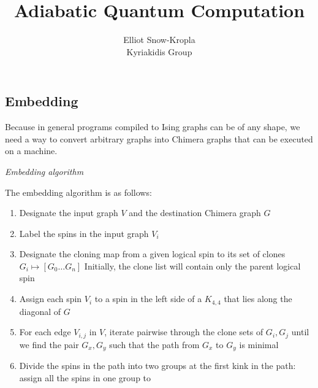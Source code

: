 \documentclass{article}
\title{Adiabatic Quantum Computation}
\author{Elliot Snow-Kropla\\Kyriakidis Group}
\begin{document}
\maketitle

\subsection{Embedding}
Because in general programs compiled to Ising graphs can be of any shape, we need a way to convert arbitrary graphs into Chimera graphs that can be executed on a machine.

\emph{ Embedding algorithm}

The embedding algorithm is as follows:

\begin{enumerate}
	\item Designate the input graph $V$ and the destination Chimera graph $G$
	\item Label the spins in the input graph $V_i$
	\item Designate the cloning map from a given logical spin to its set of clones $G_i \mapsto [G_0 \ldots G_n] $ Initially, the
		clone list will contain only the parent logical spin
	\item Assign each spin $V_i$ to a spin in the left side of a $K_{4,4}$ that lies along the diagonal of $G$
	\item For each edge $V_{i,j}$ in $V$, iterate pairwise through the clone sets of $G_i,G_j$ until we find the pair $G_x,G_y$ such that
		the path from $G_x$ to $G_y$ is minimal
	\item Divide the spins in the path into two groups at the first kink in the path: assign all the spins in one group to 
\end{enumerate}

{}

\end{document}
